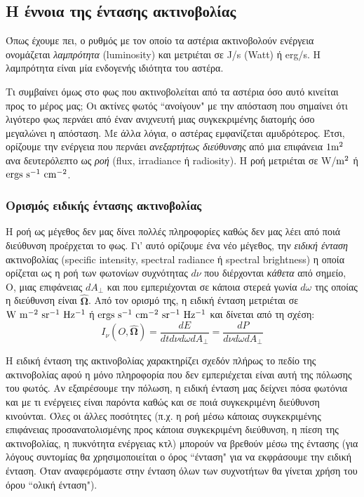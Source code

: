 \newpage
\subsection{Η έννοια της έντασης ακτινοβολίας}
Όπως έχουμε πει, ο ρυθμός με τον οποίο τα αστέρια ακτινοβολούν ενέργεια ονομάζεται \textit{λαμπρότητα} (luminosity) και μετριέται σε J/s (Watt) ή erg/s. Η λαμπρότητα είναι μία ενδογενής ιδιότητα του αστέρα. 

Τι συμβαίνει όμως στο φως που ακτινοβολείται από τα αστέρια όσο αυτό κινείται προς το μέρος μας; Οι ακτίνες φωτός ``ανοίγουν" με την απόσταση που σημαίνει ότι λιγότερο φως περνάει από έναν ανιχνευτή μιας συγκεκριμένης διατομής όσο μεγαλώνει η απόσταση. Με άλλα λόγια, ο αστέρας εμφανίζεται αμυδρότερος. Έτσι, ορίζουμε την ενέργεια που περνάει \textit{\color{red} ανεξαρτήτως διεύθυνσης} από μια επιφάνεια $\rm 1 m^2$ ανα δευτερόλεπτο ως \textit{ροή} (flux, irradiance ή radiosity). Η ροή μετριέται σε W/$\rm m^2$ ή $\rm ergs \ s^{-1} \ cm^{-2}$. 



\subsubsection{Ορισμός ειδικής έντασης ακτινοβολίας}
Η ροή ως μέγεθος δεν μας δίνει πολλές πληροφορίες καθώς δεν μας λέει από ποιά διεύθυνση προέρχεται το φως. Γι' αυτό ορίζουμε ένα νέο μέγεθος, την \textit{ειδική ένταση} ακτινοβολίας (specific intensity, spectral radiance ή spectral brightness) η οποία ορίζεται ως η ροή των φωτονίων συχνότητας $d \nu$ που διέρχονται \textit{\color{red} κάθετα} από σημείο, Ο, μιας επιφάνειας $dA_{\perp}$ και που εμπεριέχονται σε κάποια στερεά γωνία $d \omega$ της οποίας η διεύθυνση είναι $\boldsymbol{\hat{\Omega}}$. Από τον ορισμό της, η ειδική ένταση μετριέται σε $\rm W \ m^{-2} \ sr^{-1} \ Hz^{-1}$ ή $\rm ergs \ s^{-1} \ cm^{-2} \ sr^{-1} \ Hz^{-1}$ και δίνεται από τη σχέση:
\begin{equation}
    I_{\nu}(O, \boldsymbol{\hat{\Omega}}) = \frac{dE}{dt d\nu d\omega dA_{\perp}} = \frac{dP}{d\nu d\omega dA_{\perp}}
\end{equation}

Η ειδική ένταση της ακτινοβολίας χαρακτηρίζει σχεδόν πλήρως το πεδίο της ακτινοβολίας αφού η μόνο πληροφορία που δεν εμπεριέχεται είναι αυτή της πόλωσης του φωτός. Αν εξαιρέσουμε την πόλωση, η ειδική ένταση μας δείχνει πόσα φωτόνια και με τι ενέργειες είναι παρόντα καθώς και σε ποιά συγκεκριμένη διεύθυνση κινούνται. Όλες οι άλλες ποσότητες (π.χ. η ροή μέσω κάποιας συγκεκριμένης επιφάνειας προσανατολισμένης προς κάποια συγκεκριμένη διεύθυνση, η πίεση της ακτινοβολίας, η πυκνότητα ενέργειας κτλ) μπορούν να βρεθούν μέσω της έντασης (για λόγους συντομίας θα χρησιμοποιείται ο όρος ``ένταση" για να εκφράσουμε την ειδική ένταση. Όταν αναφερόμαστε στην ένταση όλων των συχνοτήτων θα γίνεται χρήση του όρου ``ολική ένταση").

